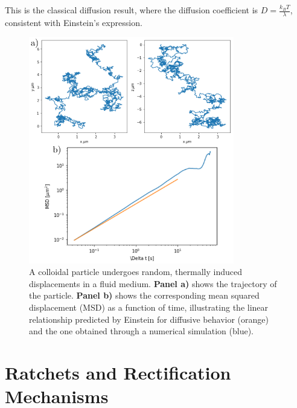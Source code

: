 This is the classical diffusion result, where the diffusion coefficient is \( D = \frac{k_B T}{\lambda} \), consistent with Einstein's expression.





\begin{figure}[H]
  \begin{center}
    \includegraphics[width=0.8\textwidth]{figures/passivebrowniantrajectorymsd.png}
  \end{center}
  \caption[Example of brownian motion]{A colloidal particle undergoes random, thermally induced displacements in a fluid medium. \textbf{Panel a)} shows the trajectory of the particle. \textbf{ Panel b)} shows the corresponding mean squared displacement (MSD) as a function of time, illustrating the linear relationship predicted by Einstein for diffusive behavior (orange) and the one obtained through a numerical simulation (blue).}\label{fig:passivebrowniantrajectory}
\end{figure}

\chapter{Ratchets and Rectification Mechanisms}
\label{ch:ratchetsandrectificationmechanisms}

